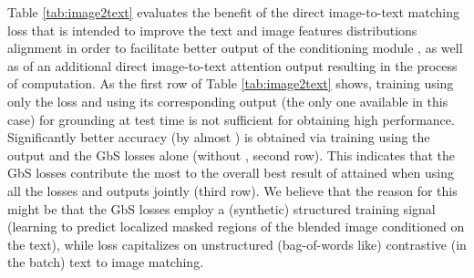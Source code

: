 \documentclass[10pt,twocolumn,letterpaper]{article}
\def\oursspace{{GbS }}
\newcommand\secvspace{\vspace{-0.0cm}}
\begin{document}
 Table \ref{tab:image2text} evaluates the benefit of the direct image-to-text matching loss  that is intended to improve the text and image features distributions alignment in order to facilitate better output of the conditioning module , as well as of an additional direct image-to-text attention output  resulting in the process of  computation. As the first row of Table \ref{tab:image2text} shows, training using only the  loss and using its corresponding output  (the only one available in this case) for grounding at test time is not sufficient for obtaining high performance. Significantly better accuracy (by almost ) is obtained via training using the  output and the \oursspace losses alone (without , second row). This indicates that the \oursspace losses contribute the most to the overall best result of  attained when using all the losses and outputs jointly (third row). We believe that the reason for this might be that the \oursspace losses employ a (synthetic) structured training signal (learning to predict localized masked regions of the blended image conditioned on the text), while  loss capitalizes on unstructured (bag-of-words like) contrastive (in the batch) text to image matching.

\secvspace
\end{document}
